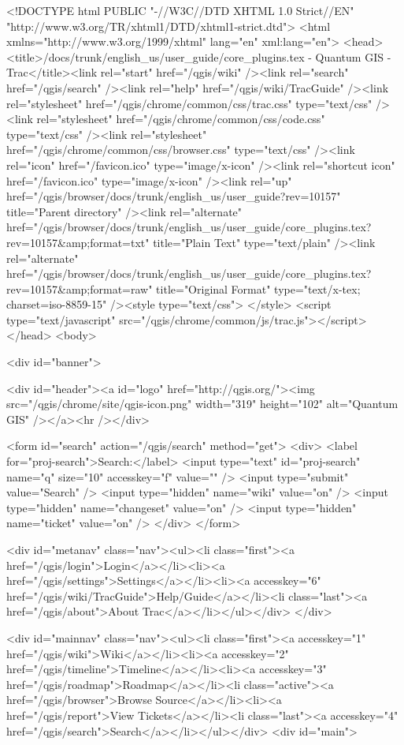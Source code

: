 <!DOCTYPE html
    PUBLIC "-//W3C//DTD XHTML 1.0 Strict//EN"
    "http://www.w3.org/TR/xhtml1/DTD/xhtml1-strict.dtd">
<html xmlns="http://www.w3.org/1999/xhtml" lang="en" xml:lang="en">
<head>
 <title>/docs/trunk/english_us/user_guide/core_plugins.tex - Quantum GIS - Trac</title><link rel="start" href="/qgis/wiki" /><link rel="search" href="/qgis/search" /><link rel="help" href="/qgis/wiki/TracGuide" /><link rel="stylesheet" href="/qgis/chrome/common/css/trac.css" type="text/css" /><link rel="stylesheet" href="/qgis/chrome/common/css/code.css" type="text/css" /><link rel="stylesheet" href="/qgis/chrome/common/css/browser.css" type="text/css" /><link rel="icon" href="/favicon.ico" type="image/x-icon" /><link rel="shortcut icon" href="/favicon.ico" type="image/x-icon" /><link rel="up" href="/qgis/browser/docs/trunk/english_us/user_guide?rev=10157" title="Parent directory" /><link rel="alternate" href="/qgis/browser/docs/trunk/english_us/user_guide/core_plugins.tex?rev=10157&amp;format=txt" title="Plain Text" type="text/plain" /><link rel="alternate" href="/qgis/browser/docs/trunk/english_us/user_guide/core_plugins.tex?rev=10157&amp;format=raw" title="Original Format" type="text/x-tex; charset=iso-8859-15" /><style type="text/css">
</style>
 <script type="text/javascript" src="/qgis/chrome/common/js/trac.js"></script>
</head>
<body>


<div id="banner">

<div id="header"><a id="logo" href="http://qgis.org/"><img src="/qgis/chrome/site/qgis-icon.png" width="319" height="102" alt="Quantum GIS" /></a><hr /></div>

<form id="search" action="/qgis/search" method="get">
 <div>
  <label for="proj-search">Search:</label>
  <input type="text" id="proj-search" name="q" size="10" accesskey="f" value="" />
  <input type="submit" value="Search" />
  <input type="hidden" name="wiki" value="on" />
  <input type="hidden" name="changeset" value="on" />
  <input type="hidden" name="ticket" value="on" />
 </div>
</form>



<div id="metanav" class="nav"><ul><li class="first"><a href="/qgis/login">Login</a></li><li><a href="/qgis/settings">Settings</a></li><li><a accesskey="6" href="/qgis/wiki/TracGuide">Help/Guide</a></li><li class="last"><a href="/qgis/about">About Trac</a></li></ul></div>
</div>

<div id="mainnav" class="nav"><ul><li class="first"><a accesskey="1" href="/qgis/wiki">Wiki</a></li><li><a accesskey="2" href="/qgis/timeline">Timeline</a></li><li><a accesskey="3" href="/qgis/roadmap">Roadmap</a></li><li class="active"><a href="/qgis/browser">Browse Source</a></li><li><a href="/qgis/report">View Tickets</a></li><li class="last"><a accesskey="4" href="/qgis/search">Search</a></li></ul></div>
<div id="main">




